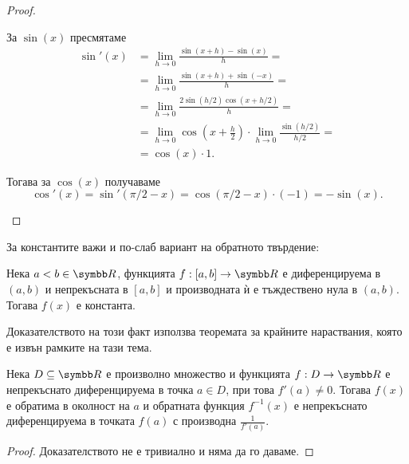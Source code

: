 \documentclass[numbers=endperiod, bibliography=totocnumbered]{scrartcl}
\begin{document}
\begin{proof}
\begin{enumerate}
    За \( \sin(x) \) пресмятаме
    \begin{align*}
      \sin'(x)
      &=
      \lim_{h \to 0} \frac {\sin(x+h) - \sin(x)} h
      = \\ &=
      \lim_{h \to 0} \frac {\sin(x+h) + \sin(-x)} h
      = \\ &=
      \lim_{h \to 0} \frac {2 \sin(h / 2) \cos(x+h/2)} h
      = \\ &=
      \lim_{h \to 0} \cos \left(x + \frac h 2 \right) \cdot \lim_{h \to 0} \frac {\sin(h / 2)} {h/2}
      = \\ &=
      \cos(x) \cdot 1.
    \end{align*}

    Тогава за \( \cos(x) \) получаваме
    \begin{equation*}
      \cos'(x) = \sin'(\pi / 2 - x) = \cos(\pi / 2 - x) \cdot (-1) = -\sin(x).
    \end{equation*}
  \end{enumerate}
\end{proof}

За константите важи и по-слаб вариант на обратното твърдение:
\begin{proposition}\label{thm:zero_derivative}
  Нека \( a < b \in \R \), функцията \( f: [a, b] \to \R \) е диференцируема в \( (a, b) \) и непрекъсната в \( [a, b] \) и производната ѝ е тъждествено нула в \( (a, b) \). Тогава \( f(x) \) е константа.
\end{proposition}
\begin{remark}
  Доказателството на този факт използва теоремата за крайните нараствания, която е извън рамките на тази тема.
\end{remark}

\begin{theorem}
  Нека \( D \subseteq \R \) е произволно множество и функцията \( f: D \to \R \) е непрекъснато диференцируема в точка \( a \in D \), при това \( f'(a) \neq 0 \). Тогава \( f(x) \) е обратима в околност на \( a \) и обратната функция \( f^{-1} (x) \) е непрекъснато диференцируема в точката \( f(a) \) с производна \( \frac 1 {f'(a)} \).
\end{theorem}
\begin{proof}
  Доказателството не е тривиално и няма да го даваме.
\end{proof}
\end{document}
